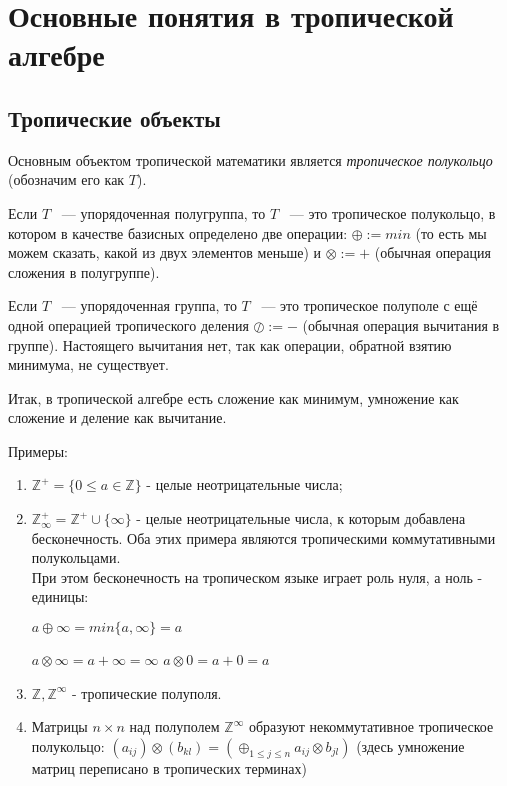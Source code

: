 \documentclass[russian]{lecture-notes}
\begin{document}
\section{Основные понятия в тропической алгебре}

\subsection{Тропические объекты}

Основным объектом тропической математики является \emph{тропическое полукольцо}  (обозначим его как $T$).

Если $T$ ~---  упорядоченная полугруппа, то $T$ ~--- это тропическое полукольцо, в котором в качестве базисных определено две операции: $\oplus :=min$ (то есть мы можем сказать, какой из двух элементов меньше) и $ \otimes :=+ $ (обычная операция сложения в полугруппе).

Если $T$ ~--- упорядоченная группа, то $T$ ~--- это тропическое полуполе с ещё одной операцией тропического деления $\oslash:= - $ (обычная операция вычитания в группе). Настоящего вычитания нет, так как операции, обратной взятию минимума, не существует.

Итак, в тропической алгебре есть сложение как минимум, умножение как сложение и деление как вычитание.


Примеры:
\begin{enumerate}
	\item $\mathbb{Z}^+=\{0\le a \in \mathbb{Z}\}$ - целые неотрицательные числа;
	\item $\mathbb{Z}^+_\infty= \mathbb{Z}^+\cup \{\infty\}$ - целые неотрицательные числа, к которым добавлена бесконечность.
	Оба этих примера являются тропическими коммутативными полукольцами.
	\\

	При этом бесконечность на тропическом языке играет роль нуля, а ноль - единицы:

	$ a \oplus \infty=min\{a, \infty\}=a $

	$a \otimes \infty=a+\infty=\infty$
	$a \otimes 0=a+0=a$
	\item $\mathbb{Z}, \mathbb{Z}^\infty$ - тропические полуполя.
	\item Матрицы $n\times n$ над полуполем $\mathbb{Z}^\infty$ образуют некоммутативное тропическое полукольцо:
	$(a_{ij})\otimes (b_{kl})=(\oplus_{1\le j\le n}a_{ij}\otimes b_{jl})$ (здесь умножение матриц переписано в тропических терминах)
\end{enumerate}
\end{document}
